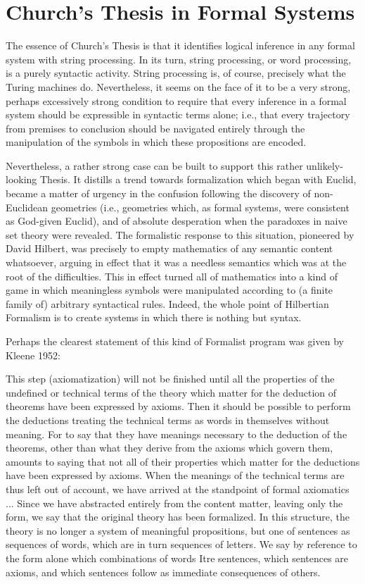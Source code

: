 \documentclass[a4paper,12pt]{article}
\begin{document}
\section{Church's Thesis in Formal Systems}

The essence of Church's Thesis is that it identifies logical inference in any
formal system with string processing. In its turn, string processing, or word
processing, is a purely syntactic activity.  String processing is, of course,
precisely what the Turing machines do. Nevertheless, it seems on the face
of it to be a very strong, perhaps excessively strong condition to require
that every inference in a formal system should be expressible in syntactic
terms alone; i.e., that every trajectory from premises to conclusion should be
navigated entirely through the manipulation of the symbols in which these
propositions are encoded.

Nevertheless, a rather strong case can be built to support this rather
unlikely-looking Thesis. It distills a trend towards formalization which
began with Euclid, became a matter of urgency in the confusion following the
discovery of non-Euclidean geometries (i.e., geometries which, as formal
systems, were consistent as God-given Euclid), and of absolute desperation
when the paradoxes in naive set theory were revealed. The formalistic response
to this situation, pioneered by David Hilbert, was precisely to empty
mathematics of any semantic content whatsoever, arguing in effect that it
was a needless semantics which was at the root of the difficulties.
This in effect turned all of mathematics into a kind of game in which meaningless
symbols were manipulated according to (a finite family of) arbitrary syntactical rules.
Indeed, the whole point of Hilbertian Formalism is to create systems in which there is
nothing but syntax.

Perhaps the clearest statement of this kind of Formalist program was given by Kleene 1952:

This step (axiomatization) will not be finished until all the properties of the
undefined or technical terms of the theory which matter for the deduction
of theorems have been expressed by axioms. Then it should be possible to
perform the deductions treating the technical terms as words in themselves
without meaning.  For to say that they have meanings necessary to the deduction
of the theorems, other than what they derive from the axioms which
govern them, amounts to saying that not all of their properties which matter
for the deductions have been expressed by axioms. When the meanings
of the technical terms are thus left out of account, we have arrived at the
standpoint of formal axiomatics ... Since we have abstracted entirely from
the content matter, leaving only the form, we say that the original theory has
been formalized. In this structure, the theory is no longer a system of meaningful
propositions, but one of sentences as sequences of words, which are
in turn sequences of letters.  We say by reference to the form alone which
combinations of words Itre sentences, which sentences are axioms, and which
sentences follow as immediate consequences of others.
\end{document}
